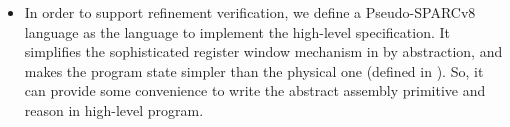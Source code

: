 \begin{itemize}
	
	

    \item 
    In order to support refinement verification, we define a 
    Pseudo-SPARCv8 language as the language to implement
    the high-level specification. 
    It simplifies 
    the sophisticated register window mechanism 
    in \sparc{} by abstraction, 
    and makes the program state 
    simpler than the physical one  
    (defined in \Sec{\ref{sec:modeling}}). 
    So, it can provide some convenience 
    to write the abstract assembly primitive 
    and reason in high-level program. 
    

\end{itemize}
